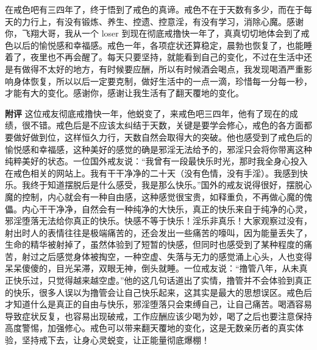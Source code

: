 \begin{case}
    在戒色吧有三四年了，终于悟到了戒色的真谛。戒色不在于天数有多少，而在于每天的力行上，有没有锻炼、养生、控遗、控意淫，有没有学习，消除心魔。感谢你，飞翔大哥，我从一个 loser 到现在彻底戒撸快一年了，真真切切地体会到了戒色以后的愉悦感和幸福感。戒色一年，各项症状还算稳定，晨勃也恢复了，也能睡着了，夜里也不再会醒了。每天只要坚持，就能看到自己的变化，不过在生活中还是有做得不太好的地方，有时候要应酬，所以有时候酒会喝点，我发现喝酒严重影响身体恢复，所以以后一定要克制，做好生活中的一点一滴，珍惜每一分每一秒，才能有大的变化。感谢你，感谢让我生活有了翻天覆地的变化。

    \textbf{附评} 这位戒友彻底戒撸快一年，他蜕变了，来戒色吧三四年，他有了现在的成绩，很不错。戒色后是不应该太纠结于天数，关键是要学会修心，戒色的各方面都要做好做到位，这样恒久力行，天数自然会取得大的突破。他也感受到了戒色后的愉悦感和幸福感，这种美好的感觉的确是邪淫无法给予的，邪淫只会将你带离这种纯粹美好的状态。一位国外戒友说：“我曾有一段最快乐时光，那时我全身心投入在戒色相关的网站上。我有干干净净的二十天（没有色情，没有手淫）。我感到快乐。我终于知道摆脱后是什么感受，我是那么快乐。”国外的戒友说得很好，摆脱心魔的控制，内心就会有一种自由感，这种感觉很宝贵，如释重负，不再做心魔的傀儡。内心干干净净，自然会有一种纯净的大快乐，真正的快乐来自于纯净的心灵，邪淫堕落无法给你真正的快乐。快感不等于快乐！淫乐非真乐！大家观察过没有，射出时人的表情往往是极端痛苦的，还会发出一些痛苦的嚎叫，因为能量丢失了，生命的精华被射掉了，虽然体验到了短暂的快感，但同时也感受到了某种程度的痛苦，射过之后感觉身体被掏空，一种空虚、失落与无力的感觉涌上心头，人也变得呆呆傻傻的，目光呆滞，双眼无神，倒头就睡。一位戒友说：“撸管八年，从未真正快乐过，只觉得越来越空虚。”他的这几句话道出了实情，撸管并不会体验到真正的快乐，很多人误以为撸管会让自己快乐起来，这其实是最大的思想误区。戒色后才知道什么是真正的自由与快乐，邪淫堕落只会束缚自己，让自己痛苦。喝酒容易导致症状反复，也容易出现破戒，工作应酬应该少喝为妙，喝了之后也要注意保持高度警惕，加强修心。戒色可以带来翻天覆地的变化，这是无数亲历者的真实体验，坚持戒下去，让身心灵蜕变，让正能量彻底爆棚！
\end{case}

